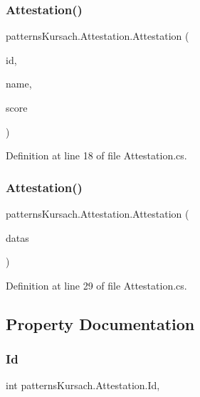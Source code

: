 \subsubsection{\texorpdfstring{Attestation()}{Attestation()}\hspace{0.1cm}{\footnotesize\ttfamily [1/2]}}
{\footnotesize\ttfamily patterns\+Kursach.\+Attestation.\+Attestation (\begin{DoxyParamCaption}\item[{int}]{id,  }\item[{string}]{name,  }\item[{int}]{score }\end{DoxyParamCaption})}



Definition at line 18 of file Attestation.\+cs.

\mbox{\label{classpatterns_kursach_1_1_attestation_afd3c137a6f89b2ff27f982d9428d6045}} 
\subsubsection{\texorpdfstring{Attestation()}{Attestation()}\hspace{0.1cm}{\footnotesize\ttfamily [2/2]}}
{\footnotesize\ttfamily patterns\+Kursach.\+Attestation.\+Attestation (\begin{DoxyParamCaption}\item[{Data\+Row}]{datas }\end{DoxyParamCaption})}



Definition at line 29 of file Attestation.\+cs.



\subsection{Property Documentation}
\mbox{\label{classpatterns_kursach_1_1_attestation_aa06355b55c39fbd88a91af20cc9c6d30}} 
\subsubsection{\texorpdfstring{Id}{Id}}
{\footnotesize\ttfamily int patterns\+Kursach.\+Attestation.\+Id\hspace{0.3cm}{\ttfamily [get]}, {\ttfamily [set]}}



